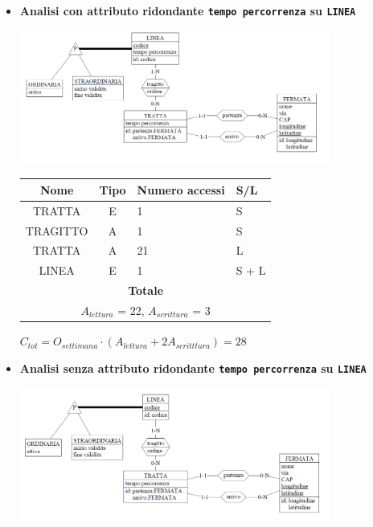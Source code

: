 \documentclass[12pt,a4paper]{report}
\begin{document}
\begin{enumerate}[label=\textbf{\arabic*}]
    \begin{itemize}
    \item \textbf{Analisi con attributo ridondante \texttt{tempo percorrenza} su \texttt{LINEA}}
    \begin{center}
    \includegraphics[width=0.8\textwidth]{AggiornaLineaRid}
    \end{center}
    \begin{table}[H]
    \centering
    \begin{tabular}{|c|c|l|l|}
    \hline
    \textbf{Nome} & \textbf{Tipo} & \textbf{Numero accessi} & \textbf{S/L} \\
    \hline
    TRATTA & E & 1 & S \\
    \hline
    TRAGITTO & A & 1 & S \\
    \hline
    TRATTA & A & 21 & L \\
    \hline
    LINEA & E & 1 & S + L \\
    \hline
    \multicolumn{4}{c}{\textbf{Totale}} \\
    \multicolumn{4}{c}{${A_{lettura}}$ = 22, ${A_{scrittura}}$ = 3} \\
    \hline
    \end{tabular}
    \end{table}
    \begin{center}
    ${C_{tot} = {O_{settimana}}\cdot({A_{lettura}} + {2A_{scritttura}})= 28}$
    \end{center}
    \item \textbf{Analisi senza attributo ridondante \texttt{tempo percorrenza} su \texttt{LINEA}}
    \begin{center}
    \includegraphics[width=0.8\textwidth]{AggiornaLineaNoRid}

\end{center}
\end{itemize}
\end{enumerate}
\end{document}
